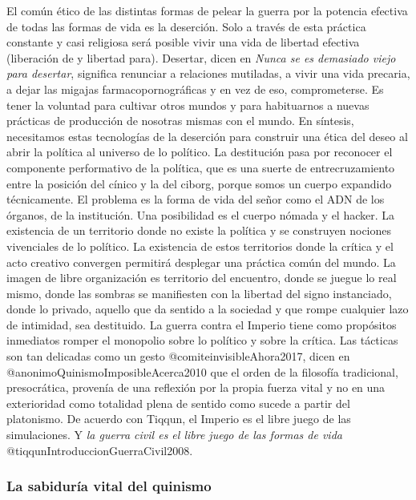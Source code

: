 \documentclass[
]{article}
\begin{document}
El común ético de las distintas formas de pelear la guerra por la
potencia efectiva de todas las formas de vida es la deserción. Solo a
través de esta práctica constante y casi religiosa será posible vivir
una vida de libertad efectiva (liberación de y libertad para). Desertar,
dicen en \emph{Nunca se es demasiado viejo para desertar}, significa
renunciar a relaciones mutiladas, a vivir una vida precaria, a dejar las
migajas farmacopornográficas y en vez de eso, comprometerse. Es tener la
voluntad para cultivar otros mundos y para habituarnos a nuevas
prácticas de producción de nosotras mismas con el mundo. En síntesis,
necesitamos estas tecnologías de la deserción para construir una ética
del deseo al abrir la política al universo de lo político. La
destitución pasa por reconocer el componente performativo de la
política, que es una suerte de entrecruzamiento entre la posición del
cínico y la del ciborg, porque somos un cuerpo expandido técnicamente.
El problema es la forma de vida del señor como el ADN de los órganos, de
la institución. Una posibilidad es el cuerpo nómada y el hacker. La
existencia de un territorio donde no existe la política y se construyen
nociones vivenciales de lo político. La existencia de estos territorios
donde la crítica y el acto creativo convergen permitirá desplegar una
práctica común del mundo. La imagen de libre organización es territorio
del encuentro, donde se juegue lo real mismo, donde las sombras se
manifiesten con la libertad del signo instanciado, donde lo privado,
aquello que da sentido a la sociedad y que rompe cualquier lazo de
intimidad, sea destituido. La guerra contra el Imperio tiene como
propósitos inmediatos romper el monopolio sobre lo político y sobre la
crítica. Las tácticas son tan delicadas como un gesto
@comiteinvisibleAhora2017, dicen en @anonimoQuinismoImposibleAcerca2010
que el orden de la filosofía tradicional, presocrática, provenía de una
reflexión por la propia fuerza vital y no en una exterioridad como
totalidad plena de sentido como sucede a partir del platonismo. De
acuerdo con Tiqqun, el Imperio es el libre juego de las simulaciones. Y
\emph{la guerra civil es el libre juego de las formas de vida}
@tiqqunIntroduccionGuerraCivil2008.

\hypertarget{la-sabiduruxeda-vital-del-quinismo}{%
\subsubsection{La sabiduría vital del
quinismo}\label{la-sabiduruxeda-vital-del-quinismo}}
\end{document}
